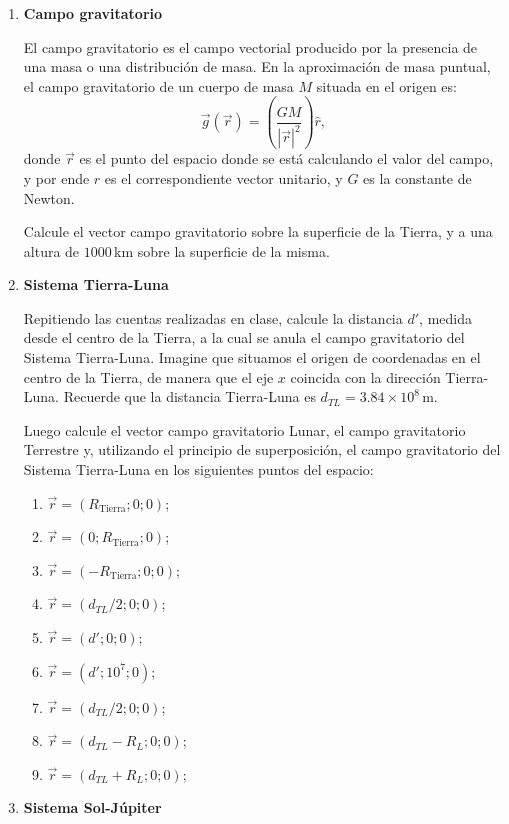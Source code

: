 \documentclass[a4paper,12pt]{article}
\begin{document}
\begin{enumerate}

\item {\bf{Campo gravitatorio}} %

  El campo gravitatorio es el campo vectorial producido por la presencia de una
masa o una distribución de masa. En la aproximación de masa puntual, el campo
gravitatorio de un cuerpo de masa $M$ situada en el origen es: \[
\vec{g}(\vec{r}) = \left (\frac{GM}{|\vec{r}|^2} \right )
\hat{r},\] donde $\vec{r}$ es el punto del espacio donde se está
calculando el valor del campo, y por ende $\hat{r}$ es el
correspondiente vector unitario, y $G$ es la constante de Newton.

Calcule el vector campo gravitatorio sobre la superficie de la Tierra, y a una
altura de $1000$\,km sobre la superficie de la misma.

\item {\bf{Sistema Tierra-Luna}} 
 
Repitiendo las cuentas realizadas en clase, calcule la distancia
$d'$, medida desde el centro de la Tierra, a la cual se anula el campo
gravitatorio del Sistema Tierra-Luna. Imagine que situamos el origen de
coordenadas en el centro de la Tierra, de manera que el eje $x$ coincida con la
dirección Tierra-Luna. Recuerde que la distancia Tierra-Luna es
$d_{TL}=3.84\times10^8$\,m.

Luego calcule el vector campo gravitatorio Lunar, el campo gravitatorio
Terrestre y, utilizando el principio de superposición, el campo gravitatorio del
Sistema Tierra-Luna en los siguientes puntos del espacio:

\begin{enumerate}
\item $\vec{r}=(R_\mathrm{Tierra};0;0)$;
\item $\vec{r}=(0;R_\mathrm{Tierra};0)$;
\item $\vec{r}=(-R_\mathrm{Tierra};0;0)$;
\item $\vec{r}=(d_{TL}/2;0;0)$;
\item $\vec{r}=(d';0;0)$;
\item $\vec{r}=(d';10^7;0)$;
\item $\vec{r}=(d_{TL}/2;0;0)$;
\item $\vec{r}=(d_{TL}-R_L;0;0)$;
\item $\vec{r}=(d_{TL}+R_L;0;0)$;
\end{enumerate} 

\item {\bf{Sistema Sol-Júpiter}}


\end{enumerate}
\end{document}
